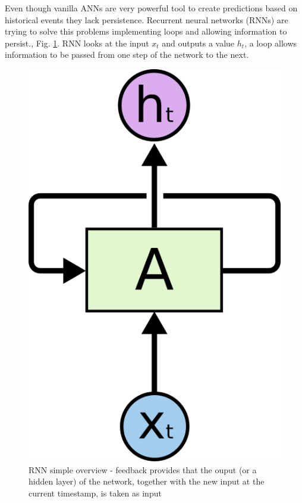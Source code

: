 \documentclass[10pt, a4paper]{article} %
\begin{document}
Even though vanilla ANNs are very powerful tool to create predictions based on historical events they lack persistence. 
Recurrent neural networks (RNNs) are trying to solve this problems implementing loops and allowing information to persist., Fig. \ref{rnn}. RNN looks at the input $ x_{t} $ and outputs a value $ h_{t} $, a loop allows information to be passed from one step of the network to the next. 
\begin{figure}
	\centering
	\includegraphics[scale=.5]{images/RNN.png} %
	\caption{RNN simple overview - feedback provides that the ouput (or a hidden layer) of the network, together with the new input at the current timestamp, is taken as input}
	\label{rnn} 
\end{figure}
\end{document}
